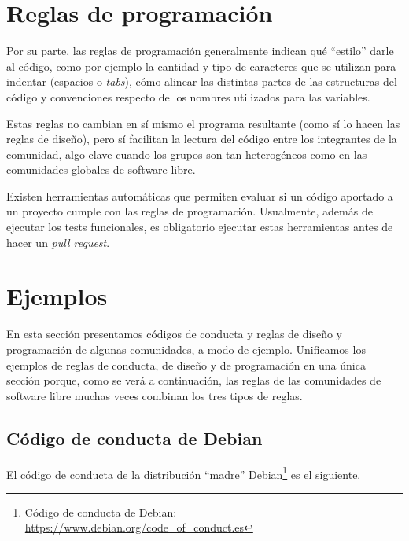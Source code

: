\section{Reglas de programación}

Por su parte, las reglas de programación generalmente indican qué ``estilo'' darle al código, como por ejemplo la cantidad y tipo de caracteres que se utilizan para indentar (espacios o \emph{tabs}), cómo alinear las distintas partes de las estructuras del código y convenciones respecto de los nombres utilizados para las variables. 

Estas reglas no cambian en sí mismo el programa resultante (como sí lo hacen las reglas de diseño), pero sí facilitan la lectura del código entre los integrantes de la comunidad, algo clave cuando los grupos son tan heterogéneos como en las comunidades globales de software libre.

Existen herramientas automáticas que permiten evaluar si un código aportado a un proyecto cumple con las reglas de programación. Usualmente, además de ejecutar los tests funcionales, es obligatorio ejecutar estas herramientas antes de hacer un \emph{pull request}.


\section{Ejemplos}

En esta sección presentamos códigos de conducta y reglas de diseño y programación de algunas comunidades, a modo de ejemplo. Unificamos los ejemplos de reglas de conducta, de diseño y de programación en una única sección porque, como se verá a continuación, las reglas de las comunidades de software libre muchas veces combinan los tres tipos de reglas.

\subsection{Código de conducta de Debian}

El código de conducta de la distribución ``madre'' Debian\footnote{Código de conducta de Debian: \url{https://www.debian.org/code_of_conduct.es}} es el siguiente.

